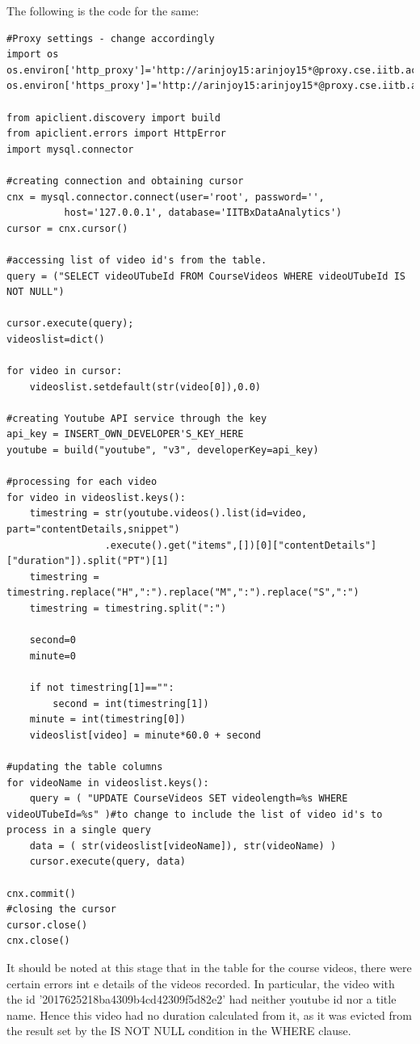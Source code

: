 \documentclass[16pt]{report}
\begin{document}
The following is the code for the same:\\

\begin{verbatim}
#Proxy settings - change accordingly
import os
os.environ['http_proxy']='http://arinjoy15:arinjoy15*@proxy.cse.iitb.ac.in:80'
os.environ['https_proxy']='http://arinjoy15:arinjoy15*@proxy.cse.iitb.ac.in:80'

from apiclient.discovery import build
from apiclient.errors import HttpError
import mysql.connector

#creating connection and obtaining cursor
cnx = mysql.connector.connect(user='root', password='', 
          host='127.0.0.1', database='IITBxDataAnalytics')
cursor = cnx.cursor()

#accessing list of video id's from the table.
query = ("SELECT videoUTubeId FROM CourseVideos WHERE videoUTubeId IS NOT NULL")

cursor.execute(query);
videoslist=dict()

for video in cursor:
	videoslist.setdefault(str(video[0]),0.0)

#creating Youtube API service through the key
api_key = INSERT_OWN_DEVELOPER'S_KEY_HERE
youtube = build("youtube", "v3", developerKey=api_key)

#processing for each video
for video in videoslist.keys():
	timestring = str(youtube.videos().list(id=video, part="contentDetails,snippet")
                 .execute().get("items",[])[0]["contentDetails"]["duration"]).split("PT")[1]
	timestring = timestring.replace("H",":").replace("M",":").replace("S",":")
	timestring = timestring.split(":")
	
	second=0
	minute=0

	if not timestring[1]=="":
		second = int(timestring[1])
	minute = int(timestring[0])
	videoslist[video] = minute*60.0 + second

#updating the table columns
for videoName in videoslist.keys():
	query = ( "UPDATE CourseVideos SET videolength=%s WHERE videoUTubeId=%s" )#to change to include the list of video id's to process in a single query
	data = ( str(videoslist[videoName]), str(videoName) )
	cursor.execute(query, data)
	
cnx.commit()
#closing the cursor
cursor.close()
cnx.close()	
\end{verbatim}

It should be noted at this stage that in the table for the course videos, there were certain errors int e details of the videos recorded. In particular, the video with the id '2017625218ba4309b4cd42309f5d82e2' had neither youtube id nor a title name. Hence this video had no duration calculated from it, as it was evicted from the result set by the IS NOT NULL condition in the WHERE clause.
\end{document}
